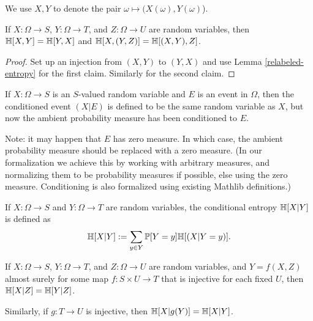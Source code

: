 We use $X,Y$ to denote the pair $\omega \mapsto (X(\omega),Y(\omega)$).

\begin{lemma}
  \label{entropy-comm}
  \leanok
  If $X: \Omega \to S$, $Y: \Omega \to T$, and $Z: \Omega \to U$ are random variables, then $\mathbb{H}[X, Y] = \mathbb{H}[Y, X]$ and $\mathbb{H}[X, (Y,Z)] = \mathbb{H}[(X,Y), Z]$.
\end{lemma}
\begin{proof}
  \leanok
  Set up an injection from $(X,Y)$ to $(Y,X)$ and use Lemma \ref{relabeled-entropy} for the first claim. Similarly for the second claim.
\end{proof}


\begin{definition}
  \label{condition-event-def}
  \leanok
  If $X: \Omega \to S$ is an $S$-valued random variable and $E$ is an event in $\Omega$, then the conditioned event $(X|E)$ is defined to be the same random variable as $X$, but now the ambient probability measure has been conditioned to $E$.
\end{definition}

Note: it may happen that $E$ has zero measure.  In which case, the ambient probability measure should be replaced with a zero measure.  (In our formalization we achieve this by working with arbitrary measures, and normalizing them to be probability measures if possible, else using the zero measure.  Conditioning is also formalized using existing Mathlib definitions.)

\begin{definition}
  \label{conditional-entropy-def}
  \leanok
  If $X: \Omega \to S$ and $Y: \Omega \to T$ are random variables, the conditional entropy $\mathbb{H}[X|Y]$ is defined as
  $$ \mathbb{H}[X|Y] := \sum_{y \in Y} \mathbb{P}[Y = y] \mathbb{H}[(X | Y=y)].$$
\end{definition}

\begin{lemma}\label{relabeled-entropy-cond}
  \leanok
  If $X: \Omega \to S$, $Y: \Omega \to T$, and $Z: \Omega \to U$ are random variables, and $Y = f(X,Z)$ almost surely for some map $f: S \times U \to T$ that is injective for each fixed $U$, then $\mathbb{H}[X|Z] = \mathbb{H}[Y|Z]$.

  Similarly, if $g: T \to U$ is injective, then $\mathbb{H}[X|g(Y)] = \mathbb{H}[X|Y]$.
\end{lemma}


